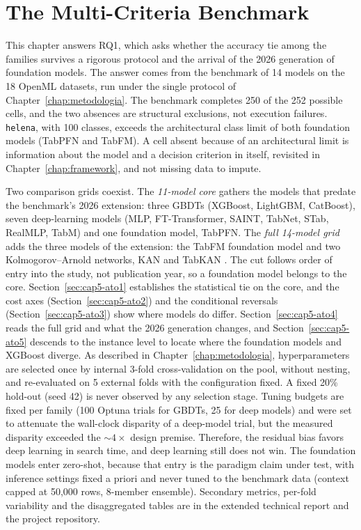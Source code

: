 \chapter{The Multi-Criteria Benchmark}
\label{chap:benchmark}
\label{sec:cap5-cobertura}

This chapter answers RQ1, which asks whether the accuracy tie among
the families survives a rigorous protocol and the arrival of the 2026
generation of foundation models. The answer comes from the benchmark of
14 models on the 18 OpenML datasets, run under the single protocol of
Chapter~\ref{chap:metodologia}. The benchmark completes 250 of
the 252 possible cells, and the two absences are structural exclusions,
not execution failures. \texttt{helena}, with 100 classes,
exceeds the architectural class limit of both foundation models
(TabPFN and TabFM). A cell absent because of an architectural
limit is information about the model and a decision criterion in
itself, revisited in Chapter~\ref{chap:framework}, and not
missing data to impute.

Two comparison grids coexist. The \emph{11-model core} gathers the
models that predate the benchmark's 2026 extension: three GBDTs (XGBoost, LightGBM,
CatBoost), seven deep-learning models (MLP, FT-Transformer, SAINT,
TabNet, STab, RealMLP, TabM) and one foundation model, TabPFN. The
\emph{full 14-model grid} adds the three models of the extension: the
TabFM foundation model \citep{tabfm2026,kong2026} and two
Kolmogorov--Arnold networks, KAN \citep{kan2024} and TabKAN
\citep{tabkan2025}. The cut follows order of entry into the study,
not publication year, so a foundation model belongs to the
core. Section~\ref{sec:cap5-ato1} establishes the statistical tie on the
core, and the cost axes (Section~\ref{sec:cap5-ato2}) and the conditional
reversals (Section~\ref{sec:cap5-ato3}) show where models do
differ. Section~\ref{sec:cap5-ato4} reads the full grid and what the
2026 generation changes, and Section~\ref{sec:cap5-ato5} descends to the
instance level to locate where the foundation models and XGBoost
diverge. As described in Chapter~\ref{chap:metodologia},
hyperparameters are selected once by internal 3-fold cross-validation
on the pool, without nesting, and re-evaluated on 5 external folds
with the configuration fixed. A fixed 20\% hold-out (seed 42)
is never observed by any selection stage. Tuning budgets are fixed per
family (100 Optuna trials for GBDTs, 25 for deep models) and
were set to attenuate the wall-clock disparity of a
deep-model trial, but the measured disparity exceeded the ${\sim}4\times$
design premise. Therefore, the residual bias favors deep learning in
search time, and deep learning still does not win. The foundation
models enter zero-shot, because that entry is the paradigm claim under
test, with inference settings fixed a priori and never tuned to
the benchmark data (context capped at 50{,}000 rows, 8-member ensemble).
Secondary metrics, per-fold variability and the disaggregated tables
are in the extended technical report and the project repository.


